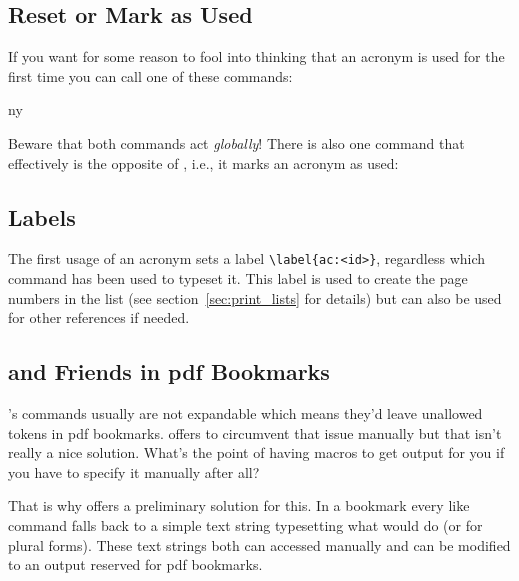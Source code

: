 \documentclass[DIV10,toc=index,toc=bib,hyperfootnotes=false]{cnpkgdoc}
\makeatletter
\newcommand*\sinceversion[1]{%
  \@bsphack
  \marginnote{%
    \footnotesize\sffamily\RaggedRight
    \textcolor{black!75}{Introduced in version~#1}}%
  \@esphack}
\makeatother
\begin{document}
\subsection{Reset or Mark as Used}
If you want for some reason to fool \acro into thinking that an acronym is used
for the first time you can call one of these commands:
\begin{beschreibung}
 \sinceversion{0.5}
\end{beschreibung}
\begin{beispiel}
 \ac{ny}
\end{beispiel}
Beware that both commands act \emph{globally}! There is also one command that
effectively is the opposite of , i.e., it marks an acronym as used:
\begin{beschreibung}
 \sinceversion{0.5}
\end{beschreibung}

\subsection{Labels}
The first usage of an acronym sets a label \verb+\label{ac:<id>}+, regardless
which command has been used to typeset it. This label is used to create the page
numbers in the list (see section~\ref{sec:print_lists} for details) but can also
be used for other references if needed.

\subsection{ and Friends in \acs*{pdf} Bookmarks}
\noindent\sinceversion{0.5}\acro's commands usually are not expandable which
means they'd leave unallowed tokens in \acs{pdf} bookmarks. 
offers  to circumvent that issue manually but that isn't
really a nice solution. What's the point of having macros to get output for you
if you have to specify it manually after all?

That is why \acro offers a preliminary solution for this. In a bookmark every
 like command falls back to a simple text string typesetting what 
would do (or  for plural forms). These text strings both can accessed
manually and can be modified to an output reserved for \acs{pdf} bookmarks.
\end{document}

